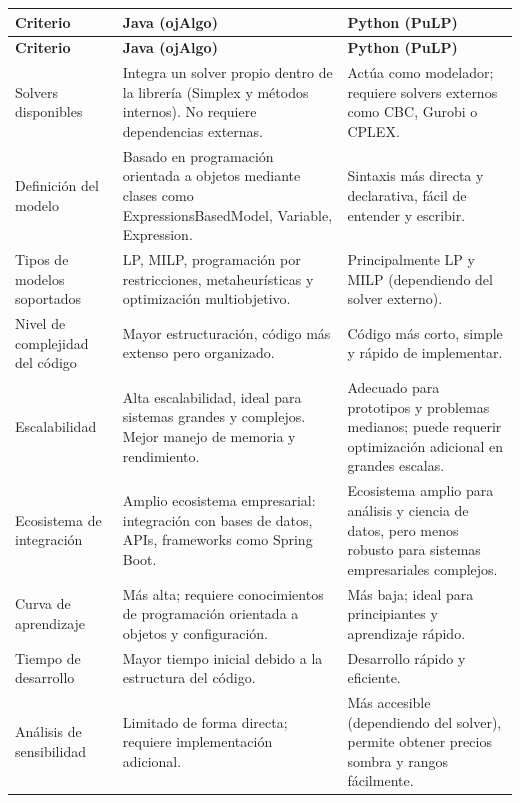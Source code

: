 \documentclass[12pt,a4paper]{article}
\begin{document}
\begin{longtable}{|>{\raggedright\arraybackslash}p{}|>{\raggedright\arraybackslash}p{}|>{\raggedright\arraybackslash}p{}|}
	\hline
	\textbf{Criterio} & \textbf{Java (ojAlgo)} & \textbf{Python (PuLP)} \\
	\hline
	\endfirsthead

	\hline
	\textbf{Criterio} & \textbf{Java (ojAlgo)} & \textbf{Python (PuLP)} \\
	\hline
	\endhead

	\hline
	\endfoot

	\hline
	\endlastfoot

	Solvers disponibles & Integra un solver propio dentro de la librería (Simplex y métodos internos). No requiere dependencias externas. & Actúa como modelador; requiere solvers externos como CBC, Gurobi o CPLEX. \\
		\hline
		Definición del modelo & Basado en programación orientada a objetos mediante clases como ExpressionsBasedModel, Variable, Expression. & Sintaxis más directa y declarativa, fácil de entender y escribir. \\
		\hline
		Tipos de modelos soportados & LP, MILP, programación por restricciones, metaheurísticas y optimización multiobjetivo. & Principalmente LP y MILP (dependiendo del solver externo). \\
		\hline
		Nivel de complejidad del código & Mayor estructuración, código más extenso pero organizado. & Código más corto, simple y rápido de implementar. \\
		\hline
		Escalabilidad & Alta escalabilidad, ideal para sistemas grandes y complejos. Mejor manejo de memoria y rendimiento. & Adecuado para prototipos y problemas medianos; puede requerir optimización adicional en grandes escalas. \\
		\hline
		Ecosistema de integración & Amplio ecosistema empresarial: integración con bases de datos, APIs, frameworks como Spring Boot. & Ecosistema amplio para análisis y ciencia de datos, pero menos robusto para sistemas empresariales complejos. \\
		\hline
		Curva de aprendizaje & Más alta; requiere conocimientos de programación orientada a objetos y configuración. & Más baja; ideal para principiantes y aprendizaje rápido. \\
		\hline
		Tiempo de desarrollo & Mayor tiempo inicial debido a la estructura del código. & Desarrollo rápido y eficiente. \\
		\hline
		Análisis de sensibilidad & Limitado de forma directa; requiere implementación adicional. & Más accesible (dependiendo del solver), permite obtener precios sombra y rangos fácilmente. \\

\end{longtable}
\end{document}
